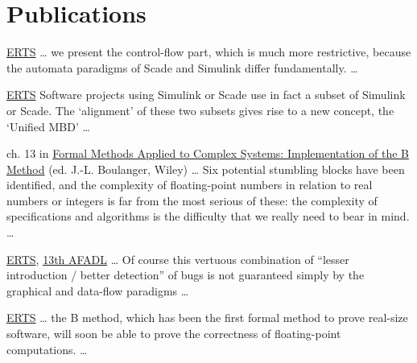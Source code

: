 \documentclass[12pt,a4paper]{moderncv}
\begin{document}

\section{Publications}

{\href{https://www.erts2018.org/uploads/program/ERTS_2018_paper_32.pdf}{ERTS}}{}{}{
\ldots
we present the control-flow part, which is much more restrictive, because the automata paradigms of Scade and Simulink differ fundamentally.
\ldots
}

{\href{https://hal.archives-ouvertes.fr/hal-01289662/document}{ERTS}}{}{}{
Software projects using Simulink or Scade use in fact a subset of Simulink or Scade. The ‘alignment’ of these two subsets gives rise to a new concept, the ‘Unified MBD’
\ldots
}

{ch. 13 in \href{https://onlinelibrary.wiley.com/doi/book/10.1002/9781119002727}{Formal Methods Applied to Complex Systems: Implementation of the B Method} (ed. J.-L. Boulanger, Wiley)}{}{}{
\ldots
Six potential stumbling blocks have been identified, and the complexity of floating‐point numbers in relation to real numbers or integers is far from the most serious of these: the complexity of specifications and algorithms is the difficulty that we really need to bear in mind.
\ldots
}

{\href{https://www.see.asso.fr/file/13256/download/21932}{ERTS}, \href{https://hal.archives-ouvertes.fr/hal-00997676/document}{13th AFADL}}{}{}{
\ldots
Of course this vertuous combination of “lesser introduction / better detection” of bugs is not guaranteed simply by the graphical and data-flow paradigms
\ldots
}

{\href{https://web1.see.asso.fr/erts2012/Site/0P2RUC89/5C-2.pdf}{ERTS}}{}{}{
\ldots
the B method, which has been the first formal method to prove real-size software, will soon be able to prove the correctness of floating-point computations.
\ldots
}
\end{document}
